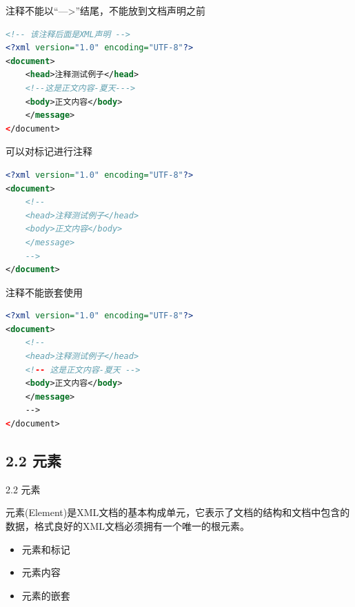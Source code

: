 \begin{frame}[fragile]{注释不能以“--->”结尾，不能放到文档声明之前}
\begin{lstlisting}[tabsize=8, basicstyle=\small\tt, language=XML]
<!-- 该注释后面是XML声明 -->
<?xml version="1.0" encoding="UTF-8"?>
<document>
    <head>注释测试例子</head>
    <!--这是正文内容-夏天--->
    <body>正文内容</body>
    </message>
</document>
\end{lstlisting}
\end{frame}


\begin{frame}[fragile]{可以对标记进行注释}
\begin{lstlisting}[tabsize=8, basicstyle=\small\tt, language=XML]
<?xml version="1.0" encoding="UTF-8"?>
<document>
    <!--
    <head>注释测试例子</head>
    <body>正文内容</body>
    </message>
    -->
</document>
\end{lstlisting}
\end{frame}


\begin{frame}[fragile]{注释不能嵌套使用}
\begin{lstlisting}[tabsize=8, basicstyle=\small\tt, language=XML]
<?xml version="1.0" encoding="UTF-8"?>
<document>
    <!--
    <head>注释测试例子</head>
    <!-- 这是正文内容-夏天 -->
    <body>正文内容</body>
    </message>
    -->
</document>
\end{lstlisting}
\end{frame}



\subsection{2.2 元素}

\begin{frame}{2.2 元素}
\par 元素(Element)是XML文档的基本构成单元，它表示了文档的结构和文档中包含的数据，格式良好的XML文档必须拥有一个唯一的根元素。
\begin{itemize}
\item 元素和标记
\item  元素内容
\item 元素的嵌套
\end{itemize}
\end{frame}

